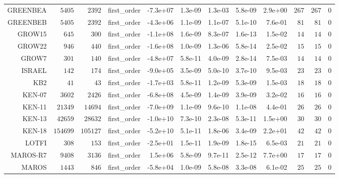\begin{longtable}{rrrrrrrrrrrr}
  GREENBEA & \(  5405\) & \(  2392\) & first\_order & -7.3e+07 &  1.3e-09 &  1.3e-03 &  5.8e-09 &  2.9e+00 & \(   267\) & \(   267\) & \(     0\) \\
  GREENBEB & \(  5405\) & \(  2392\) & first\_order & -4.3e+06 &  1.1e-09 &  1.1e-07 &  5.1e-10 &  7.6e-01 & \(    81\) & \(    81\) & \(     0\) \\
  GROW15 & \(   645\) & \(   300\) & first\_order & -1.1e+08 &  1.6e-09 &  8.3e-07 &  1.6e-13 &  1.5e-02 & \(    14\) & \(    14\) & \(     0\) \\
  GROW22 & \(   946\) & \(   440\) & first\_order & -1.6e+08 &  1.0e-09 &  1.3e-06 &  5.8e-14 &  2.5e-02 & \(    15\) & \(    15\) & \(     0\) \\
  GROW7 & \(   301\) & \(   140\) & first\_order & -4.8e+07 &  5.8e-11 &  4.0e-09 &  2.8e-14 &  7.5e-03 & \(    14\) & \(    14\) & \(     0\) \\
  ISRAEL & \(   142\) & \(   174\) & first\_order & -9.0e+05 &  3.5e-09 &  5.0e-10 &  3.7e-10 &  9.5e-03 & \(    23\) & \(    23\) & \(     0\) \\
  KB2 & \(    41\) & \(    43\) & first\_order & -1.7e+03 &  5.8e-11 &  1.2e-09 &  5.3e-09 &  1.5e-03 & \(    18\) & \(    18\) & \(     0\) \\
  KEN-07 & \(  3602\) & \(  2426\) & first\_order & -6.8e+08 &  4.5e-09 &  1.4e-09 &  3.9e-09 &  3.2e-02 & \(    16\) & \(    16\) & \(     0\) \\
  KEN-11 & \( 21349\) & \( 14694\) & first\_order & -7.0e+09 &  1.1e-09 &  9.6e-10 &  1.1e-08 &  4.4e-01 & \(    26\) & \(    26\) & \(     0\) \\
  KEN-13 & \( 42659\) & \( 28632\) & first\_order & -1.0e+10 &  7.3e-10 &  2.3e-08 &  5.3e-11 &  1.5e+00 & \(    30\) & \(    30\) & \(     0\) \\
  KEN-18 & \(154699\) & \(105127\) & first\_order & -5.2e+10 &  5.1e-11 &  1.8e-06 &  3.4e-09 &  2.2e+01 & \(    42\) & \(    42\) & \(     0\) \\
  LOTFI & \(   308\) & \(   153\) & first\_order & -2.5e+01 &  1.5e-11 &  1.9e-09 &  1.8e-15 &  6.5e-03 & \(    21\) & \(    21\) & \(     0\) \\
  MAROS-R7 & \(  9408\) & \(  3136\) & first\_order &  1.5e+06 &  5.8e-09 &  9.7e-11 &  2.5e-12 &  7.7e+00 & \(    17\) & \(    17\) & \(     0\) \\
  MAROS & \(  1443\) & \(   846\) & first\_order & -5.8e+04 &  1.0e-09 &  5.8e-08 &  3.3e-08 &  6.1e-02 & \(    25\) & \(    25\) & \(     0\) \\

\end{longtable}
